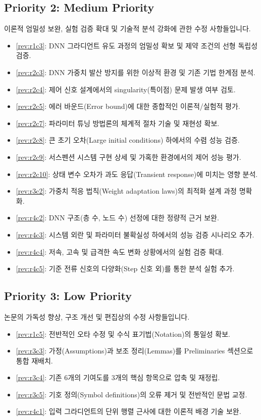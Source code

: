 \subsection*{Priority 2: Medium Priority}
이론적 엄밀성 보완, 실험 검증 확대 및 기술적 분석 강화에 관한 수정 사항들입니다.
\begin{itemize}
    \item \cref{rev:r1c3}: DNN 그라디언트 유도 과정의 엄밀성 확보 및 제약 조건의 선형 독립성 검증.
    \item \cref{rev:r2c3}: DNN 가중치 발산 방지를 위한 이상적 환경 및 기존 기법 한계점 분석.
    \item \cref{rev:r2c4}: 제어 신호 설계에서의 singularity(특이점) 문제 발생 여부 검토.
    \item \cref{rev:r2c5}: 에러 바운드(Error bound)에 대한 종합적인 이론적/실험적 평가.
    \item \cref{rev:r2c7}: 파라미터 튜닝 방법론의 체계적 절차 기술 및 재현성 확보.
    \item \cref{rev:r2c8}: 큰 초기 오차(Large initial conditions) 하에서의 수렴 성능 검증.
    \item \cref{rev:r2c9}: 서스펜션 시스템 구현 상세 및 가혹한 환경에서의 제어 성능 평가.
    \item \cref{rev:r2c10}: 상태 변수 오차가 과도 응답(Transient response)에 미치는 영향 분석.
    \item \cref{rev:r3c2}: 가중치 적응 법칙(Weight adaptation laws)의 최적화 설계 과정 명확화.
    \item \cref{rev:r4c2}: DNN 구조(층 수, 노드 수) 선정에 대한 정량적 근거 보완.
    \item \cref{rev:r4c3}: 시스템 외란 및 파라미터 불확실성 하에서의 성능 검증 시나리오 추가.
    \item \cref{rev:r4c4}: 저속, 고속 및 급격한 속도 변화 상황에서의 실험 검증 확대.
    \item \cref{rev:r4c5}: 기준 전류 신호의 다양화(Step 신호 외)를 통한 분석 실험 추가.
\end{itemize}

\subsection*{Priority 3: Low Priority}
논문의 가독성 향상, 구조 개선 및 편집상의 수정 사항들입니다.
\begin{itemize}
    \item \cref{rev:r1c5}: 전반적인 오타 수정 및 수식 표기법(Notation)의 통일성 확보.
    \item \cref{rev:r3c3}: 가정(Assumptions)과 보조 정리(Lemmas)를 Preliminaries 섹션으로 통합 재배치.
    \item \cref{rev:r3c4}: 기존 6개의 기여도를 3개의 핵심 항목으로 압축 및 재정립.
    \item \cref{rev:r3c5}: 기호 정의(Symbol definitions)의 오류 제거 및 전반적인 문법 교정.
    \item \cref{rev:r4c1}: 입력 그라디언트의 단위 행렬 근사에 대한 이론적 배경 기술 보완.
\end{itemize}
